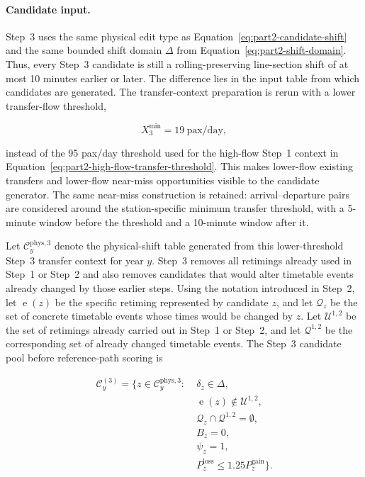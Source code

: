\documentclass[preprint,12pt]{elsarticle}
\begin{document}
\paragraph*{Candidate input.}
Step~3 uses the same physical edit type as Equation~\eqref{eq:part2-candidate-shift} and the same bounded shift domain \(\Delta\) from Equation~\eqref{eq:part2-shift-domain}. Thus, every Step~3 candidate is still a rolling-preserving line-section shift of at most 10 minutes earlier or later. The difference lies in the input table from which candidates are generated. The transfer-context preparation is rerun with a lower transfer-flow threshold,

\begin{equation}
X^{\min}_3
=
19\ \mathrm{pax/day},
\label{eq:part2-step3-transfer-threshold}
\end{equation}

instead of the 95 pax/day threshold used for the high-flow Step~1 context in Equation~\eqref{eq:part2-high-flow-transfer-threshold}. This makes lower-flow existing transfers and lower-flow near-miss opportunities visible to the candidate generator. The same near-miss construction is retained: arrival--departure pairs are considered around the station-specific minimum transfer threshold, with a 5-minute window before the threshold and a 10-minute window after it.

Let \(\mathcal{C}^{\mathrm{phys},3}_y\) denote the physical-shift table generated from this lower-threshold Step~3 transfer context for year \(y\). Step~3 removes all retimings already used in Step~1 or Step~2 and also removes candidates that would alter timetable events already changed by those earlier steps. Using the notation introduced in Step~2, let \(\operatorname{e}(z)\) be the specific retiming represented by candidate \(z\), and let \(\mathcal{Q}_z\) be the set of concrete timetable events whose times would be changed by \(z\). Let \(\mathcal{U}^{1,2}\) be the set of retimings already carried out in Step~1 or Step~2, and let \(\mathcal{Q}^{1,2}\) be the corresponding set of already changed timetable events. The Step~3 candidate pool before reference-path scoring is

\begin{equation}
\begin{aligned}
\mathcal{C}^{(3)}_y
=
\{z\in\mathcal{C}^{\mathrm{phys},3}_y:\;&
\delta_z\in\Delta,\\
&
\operatorname{e}(z)\notin\mathcal{U}^{1,2},\\
&
\mathcal{Q}_z\cap\mathcal{Q}^{1,2}=\emptyset,\\
&
B_z=0,\\
&
\psi_z=1,\\
&
P^{\mathrm{loss}}_z\le1.25P^{\mathrm{gain}}_z
\}.
\end{aligned}
\label{eq:part2-step3-candidate-pool}
\end{equation}
\end{document}
